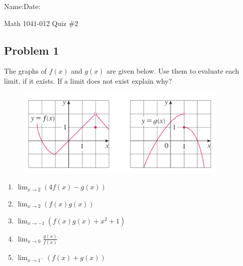 \documentclass[10pt]{book}
\theoremstyle{definition}
\begin{document}
\begin{flushleft}
Name:\underline{\hspace{13cm}}Date:\underline{\hspace{2cm}}
\end{flushleft}
\begin{center}
{\Large Math 1041-012 \hspace{0.5cm} Quiz \#2}
\end{center}
\vspace{0.2 cm}
\subsection*{Problem 1} The graphs of $f(x)$ and $g(x)$ are given below. Use them to evaluate each limit, if it exists. If a limit does not exist explain why?
\begin{figure}[h]
    \centering
    \includegraphics[width=4in]{fandg.png}
\end{figure}
\begin{enumerate}[label=(\alph*)]
    \item $\displaystyle \lim_{x\rightarrow 2}\left(4f(x)-g(x)\right)$ \vspace{1.5cm}
    \item $\displaystyle \lim_{x\rightarrow 2}\left(f(x)g(x)\right)$\vspace{1.5cm}
    \item $\displaystyle \lim_{x\rightarrow -1}\left(f(x)g(x)+x^2+1\right)$\vspace{1.5cm}
    \item $\displaystyle \lim_{x\rightarrow 0}\frac{g(x)}{f(x)}$\vspace{1.5cm}
    \item $\displaystyle \lim_{x\rightarrow 1^-}\left(f(x)+g(x)\right)$
\end{enumerate}
\raggedbottom
\pagebreak
\end{document}
